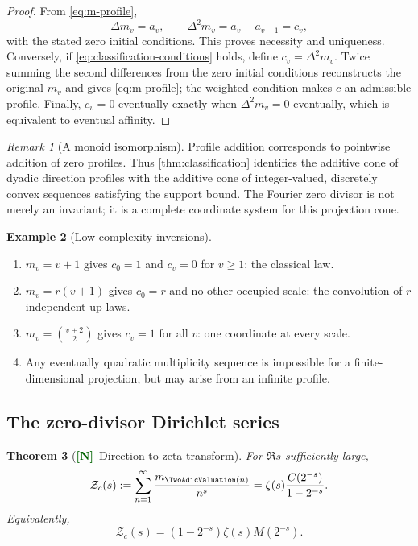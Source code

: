 \documentclass[11pt]{article}
\numberwithin{equation}{section}
\newtheorem{theorem}{Theorem}[section]
\theoremstyle{definition}
\newtheorem{example}[theorem]{Example}
\theoremstyle{remark}
\newtheorem{remark}[theorem]{Remark}
\newcommand{\New}{\textcolor{darkgreen}{\textsf{\textbf{[N]}}}}
\begin{document}
\begin{proof}
From \eqref{eq:m-profile},
\[
 \Delta m_v=a_v,
 \qquad
 \Delta^2m_v=a_v-a_{v-1}=c_v,
\]
with the stated zero initial conditions.  This proves necessity and
uniqueness.  Conversely, if \eqref{eq:classification-conditions} holds, define
$c_v=\Delta^2m_v$.  Twice summing the second differences from the zero initial
conditions reconstructs the original $m_v$ and gives
\eqref{eq:m-profile}; the weighted condition makes $c$ an admissible profile.
Finally, $c_v=0$ eventually exactly when $\Delta^2m_v=0$ eventually, which is
equivalent to eventual affinity.
\end{proof}

\begin{remark}[A monoid isomorphism]
Profile addition corresponds to pointwise addition of zero profiles.  Thus
\cref{thm:classification} identifies the additive cone of dyadic direction
profiles with the additive cone of integer-valued, discretely convex sequences
satisfying the support bound.  The Fourier zero divisor is not merely an
invariant; it is a complete coordinate system for this projection cone.
\end{remark}

\begin{example}[Low-complexity inversions]
\begin{enumerate}[label=\textup{(\alph*)},leftmargin=*]
\item $m_v=v+1$ gives $c_0=1$ and $c_v=0$ for $v\ge1$: the classical law.
\item $m_v=r(v+1)$ gives $c_0=r$ and no other occupied scale: the convolution
      of $r$ independent up-laws.
\item $m_v=\binom{v+2}{2}$ gives $c_v=1$ for all $v$: one coordinate at every
      scale.
\item Any eventually quadratic multiplicity sequence is impossible for a
      finite-dimensional projection, but may arise from an infinite profile.
\end{enumerate}
\end{example}

\subsection{The zero-divisor Dirichlet series}

\begin{theorem}[\New\ Direction-to-zeta transform]
\label{thm:zero-zeta}
For $\Re s$ sufficiently large,
\begin{equation}
 \mathcal Z_c(s)
 :=\sum_{n=1}^{\infty}\frac{m_{\TwoAdicValuation(n)}}{n^s}
 =\zeta(s)\frac{C(2^{-s})}{1-2^{-s}}.
 \label{eq:zero-zeta}
\end{equation}
Equivalently,
\begin{equation}
 \mathcal Z_c(s)
 =(1-2^{-s})\zeta(s)M(2^{-s}).
\end{equation}
\end{theorem}
\end{document}
